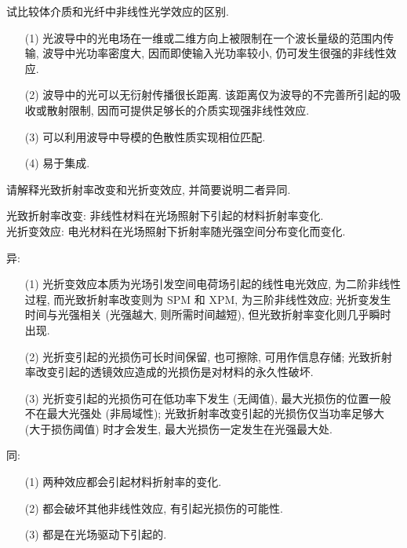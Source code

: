 \documentclass{assignment}
\begin{document}
\begin{prob}
    试比较体介质和光纤中非线性光学效应的区别.
\end{prob}
\begin{sol}
    \begin{itemize}
        \item[(1)] 光波导中的光电场在一维或二维方向上被限制在一个波长量级的范围内传输, 波导中光功率密度大, 因而即使输入光功率较小, 仍可发生很强的非线性效应.
        \item[(2)] 波导中的光可以无衍射传播很长距离. 该距离仅为波导的不完善所引起的吸收或散射限制, 因而可提供足够长的介质实现强非线性效应.
        \item[(3)] 可以利用波导中导模的色散性质实现相位匹配.
        \item[(4)] 易于集成.
    \end{itemize}
\end{sol}

\begin{prob}
    请解释光致折射率改变和光折变效应, 并简要说明二者异同.
\end{prob}
\begin{sol}
    光致折射率改变: 非线性材料在光场照射下引起的材料折射率变化.\\
    光折变效应: 电光材料在光场照射下折射率随光强空间分布变化而变化.

    异:
    \begin{itemize}
        \item[(1)] 光折变效应本质为光场引发空间电荷场引起的线性电光效应, 为二阶非线性过程, 而光致折射率改变则为 SPM 和 XPM, 为三阶非线性效应; 光折变发生时间与光强相关 (光强越大, 则所需时间越短), 但光致折射率变化则几乎瞬时出现.
        \item[(2)] 光折变引起的光损伤可长时间保留, 也可擦除, 可用作信息存储; 光致折射率改变引起的透镜效应造成的光损伤是对材料的永久性破坏.
        \item[(3)] 光折变引起的光损伤可在低功率下发生 (无阈值), 最大光损伤的位置一般不在最大光强处 (非局域性); 光致折射率改变引起的光损伤仅当功率足够大 (大于损伤阈值) 时才会发生, 最大光损伤一定发生在光强最大处.
    \end{itemize}

    同:
    \begin{itemize}
        \item[(1)] 两种效应都会引起材料折射率的变化.
        \item[(2)] 都会破坏其他非线性效应, 有引起光损伤的可能性.
        \item[(3)] 都是在光场驱动下引起的.
    \end{itemize}
\end{sol}
\end{document}
